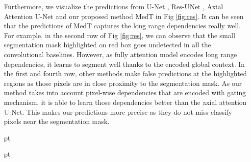 \documentclass[runningheads]{llncs}
\begin{document}
	Furthermore, we visualize the predictions from U-Net \cite{ronneberger2015u}, Res-UNet \cite{xiao2018weighted}, Axial Attention U-Net \cite{wang2020axial} and our proposed method MedT in Fig \ref{fig:res}. It can be seen that the predictions of MedT captures the long range dependencies really well. For example, in the second row of Fig \ref{fig:res}, we can observe that the small segmentation mask highlighted on red box goes undetected in all the convolutional baselines. However, as fully attention model encodes long range dependencies, it learns to segment well thanks to the encoded global context. In the first and fourth row, other methods make false predictions at the highlighted regions as those pixels are in close proximity to the segmentation mask. As our method takes into account pixel-wise dependencies that are encoded with gating mechanism, it is able to learn those dependencies better than the axial attention U-Net. This makes our predictions more precise as they do not miss-classify pixels near the segmentation mask.   
	
	\begin{table}[]
		 pt
		\centering
		\caption{Ablation Study}
		\label{table:abl}
		 pt
	\end{table}
\end{document}

